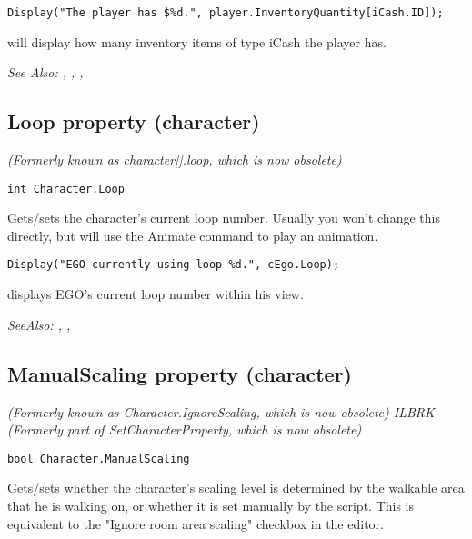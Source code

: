 \begin{verbatim}
Display("The player has $%d.", player.InventoryQuantity[iCash.ID]);
\end{verbatim}
will display how many inventory items of type iCash the player has.

\it{See Also:} ,
,
,


\subsection{Loop property (character)}\label{Character.Loop}%

\it{(Formerly known as character[].loop, which is now obsolete)}

\begin{verbatim}
int Character.Loop
\end{verbatim}
Gets/sets the character's current loop number. Usually you won't change this
directly, but will use the Animate command to play an animation.

\begin{verbatim}
Display("EGO currently using loop %d.", cEgo.Loop);
\end{verbatim}
displays EGO's current loop number within his view.

\it{SeeAlso:} ,
,


\subsection{ManualScaling property (character)}\label{Character.ManualScaling}%

\it{(Formerly known as Character.IgnoreScaling, which is now obsolete)} ILBRK
\it{(Formerly part of SetCharacterProperty, which is now obsolete)}

\begin{verbatim}
bool Character.ManualScaling
\end{verbatim}
Gets/sets whether the character's scaling level is determined by the walkable area that
he is walking on, or whether it is set manually by the script. This is equivalent
to the "Ignore room area scaling" checkbox in the editor.

